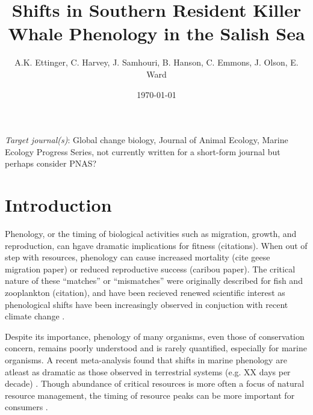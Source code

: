 \documentclass{article}
\begin{document}

\title{Shifts in Southern Resident Killer Whale Phenology in the Salish Sea}
\date{\today}
\maketitle
\author{A.K. Ettinger, C. Harvey, J. Samhouri, B. Hanson, C. Emmons, J. Olson, E. Ward}
\maketitle  %
\par 
\emph{Target journal(s)}: Global change biology, Journal of Animal Ecology, Marine Ecology Progress Series, not currently written for a short-form journal but perhaps consider PNAS?
\section* {Introduction}
\par Phenology, or the timing of biological activities such as migration, growth, and reproduction, can hgave dramatic implications for fitness (citations). When out of step with resources, phenology can cause increased mortality (cite geese migration paper) or reduced reproductive success (caribou paper). The critical nature of these ``matches'' or  ``mismatches'' were originally described for fish and zooplankton (citation), and have been recieved renewed scientific interest as phenological shifts have been increasingly observed in conjuction with recent climate change \citep{durant2007}. 

\par Despite its importance, phenology of many organisms, even those of conservation concern, remains poorly understood and is rarely quantified, especially for marine organisms. A recent meta-analysis found that shifts in marine phenology are atleast as dramatic as those observed in terrestrial systems (e.g. XX days per decade) \citep{poloczanska2013}. Though abundance of critical resources is more often a focus of natural resource management, the timing of resource peaks can be more important for consumers \citep{hipfner2008}.
 
\end{document}
